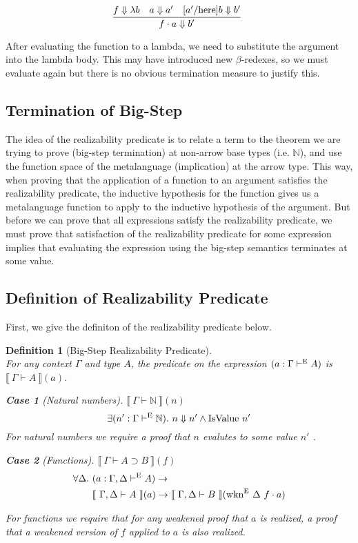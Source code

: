 \documentclass[preprint,nonatbib]{sigplanconf}
\newtheorem{defin}{Definition}
\newtheorem{subdefin}{Case}
\numberwithin{subdefin}{defin}
\numberwithin{subtheorem}{theorem}
\def\bigstep{\Downarrow}
\def\arr{\supset}
\def\marr{\rightarrow}
\def\app{\cdot}
\def\lam{\lambda}
\def\nat{\mathbb{N}}
\newcommand{\turn}[1]{\vdash^\con{#1}}
\newcommand{\all}[1]{\forall#1.~}
\newcommand{\el}[1]{\llbracket ~ #1 ~ \rrbracket}
\newcommand{\wkne}[1]{\fun{wkn}^\con{E} ~ \Delta ~ #1}
\newcommand{\con}[1]{\textmd{#1}}
\newcommand{\fun}[1]{\textmd{#1}}
\newcommand{\typm}[1]{\el{\Gamma \vdash #1}}
\newcommand{\gdtypm}[1]{\el{\Gamma, \Delta \vdash #1}}
\newcommand{\type}[1]{\Gamma \turn{E} #1}
\newcommand{\gdtype}[1]{\Gamma, \Delta \turn{E} #1}
\begin{document}
$$
\infer
  []{f \app a \bigstep {b'}}
{
  f \bigstep \lam b
  &
  a \bigstep a'
  &
  [a'/\con{here}]b \bigstep b'
}
$$

After evaluating the function to a lambda, we need to
substitute the argument into the lambda body. This may have introduced
new $\beta$-redexes, so we must evaluate again but
there is no obvious termination measure to justify this.

\subsection{Termination of Big-Step}


The idea of the realizability predicate is to relate a term to the
theorem we are trying to prove (big-step termination) at non-arrow
base types (i.e. $\nat$), and use the function space of the
metalanguage (implication) at the arrow type. This way, when proving
that the application of a function to an argument satisfies the
realizability predicate, the inductive hypothesis for the function
gives us a metalanguage function to apply to the inductive hypothesis
of the argument. But before we can prove that all expressions satisfy
the realizability predicate, we must prove that satisfaction of the
realizability predicate for some expression implies that evaluating
the expression using the big-step semantics terminates at some value.

\subsection{Definition of Realizability Predicate}

First, we give the definiton of the realizability predicate below.

\begin{defin}[Big-Step Realizability Predicate]
\label{def:ep}
$ $\\
For any context $\Gamma$ and type $A$, the predicate on the expression
$(a : \type{A})$ is $\typm{A}(a)$.

\begin{subdefin}[Natural numbers]
$\typm{\nat}(n)$
$$
\exists (n' : \type{\nat}).~ n \bigstep n' \wedge \fun{IsValue} ~ n'
$$
For natural numbers we require a proof that $n$ evalutes to
some value $n'$ .
\end{subdefin}


\begin{subdefin}[Functions]
$\typm{A \arr B}(f)$
\begin{align*}
\all{\Delta} &(a : \gdtype{A}) \marr \\
&\gdtypm{A}(a) \marr \gdtypm{B}(\wkne{f} \app a)
\end{align*}

For functions we require that for any weakened proof that $a$
is realized, a proof that a weakened version of $f$ applied to
$a$ is also realized.
\end{subdefin}

\end{defin}
\end{document}
